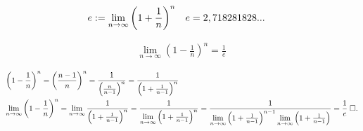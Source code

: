 \documentclass{article}
\begin{document}
\begin{align*}
	 & e:=\slimty\left(1+\frac{1}{n}\right)^{n} &  & e=2,718281828...
\end{align*}

\theorem
\begin{align*}
	\lim\limits_{n\to\infty}{\left(1-\frac{1}{n}\right)^n}=\frac{1}{e}
\end{align*}

\proof

\begin{align*}
	 & \left(1-\frac{1}{n}\right)^n=\left(\frac{n-1}{n}\right)^n=\frac{1}{\left(\frac{n}{n-1}\right)^n}=\frac{1}{\left(1+\frac{1}{n-1}\right)^n} \\
	 & \lim\limits_{n\to\infty}{\left(1-\frac{1}{n}\right)^n}=\lim\limits_{n\to\infty}{\frac{1}{\left(1+\frac{1}{n-1}\right)^n}}
	=\frac{1}{\lim\limits_{n\to\infty}{\left(1+\frac{1}{n-1}\right)^n}}
	=\frac{1}{\lim\limits_{n\to\infty}{\left(1+\frac{1}{n-1}\right)^{n-1}}\lim\limits_{n\to\infty}{\left(1+\frac{1}{n-1}\right)}}=\frac{1}{e}\qed
\end{align*}
\end{document}
